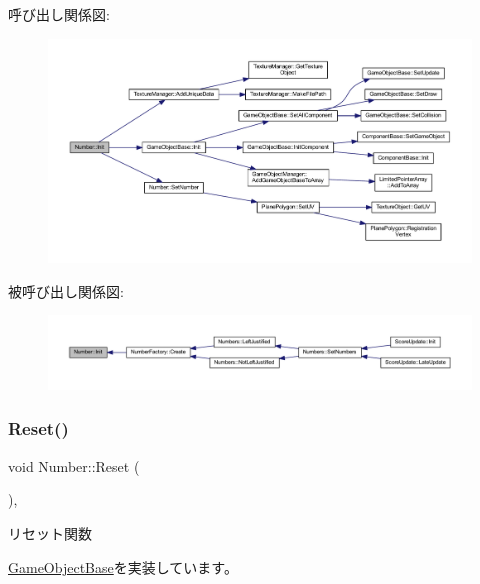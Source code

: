 呼び出し関係図\+:\nopagebreak
\begin{figure}[H]
\begin{center}
\leavevmode
\includegraphics[width=350pt]{class_number_ad92c9038810d0f831fdb9b5b13901b79_cgraph}
\end{center}
\end{figure}
被呼び出し関係図\+:\nopagebreak
\begin{figure}[H]
\begin{center}
\leavevmode
\includegraphics[width=350pt]{class_number_ad92c9038810d0f831fdb9b5b13901b79_icgraph}
\end{center}
\end{figure}
\mbox{\label{class_number_a7c6facdb1b3d0acc8309e0a915863d44}} 
\subsubsection{\texorpdfstring{Reset()}{Reset()}}
{\footnotesize\ttfamily void Number\+::\+Reset (\begin{DoxyParamCaption}{ }\end{DoxyParamCaption})\hspace{0.3cm}{\ttfamily [override]}, {\ttfamily [virtual]}}



リセット関数 



\mbox{\hyperlink{class_game_object_base_a85c59554f734bcb09f1a1e18d9517dce}{Game\+Object\+Base}}を実装しています。



